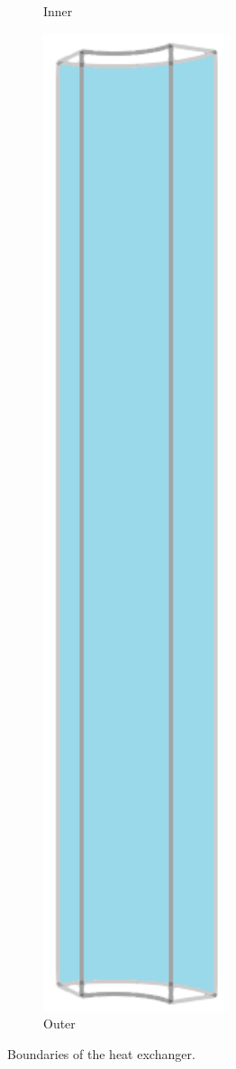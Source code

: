 \begin{figure}[!htb]
\begin{subfigure}[b]{0.16\textwidth}
    \caption{Inner}
  \end{subfigure}
  \begin{subfigure}[b]{0.16\textwidth}
    \centering
    \includegraphics[width=0.6\textwidth]{Chapter5/figures/spallation/geometry_outer}
    \caption{Outer}
  \end{subfigure}
  \caption{Boundaries of the heat exchanger.}
  \label{fig: Chapter5/spallation/boundaries}
\end{figure}
